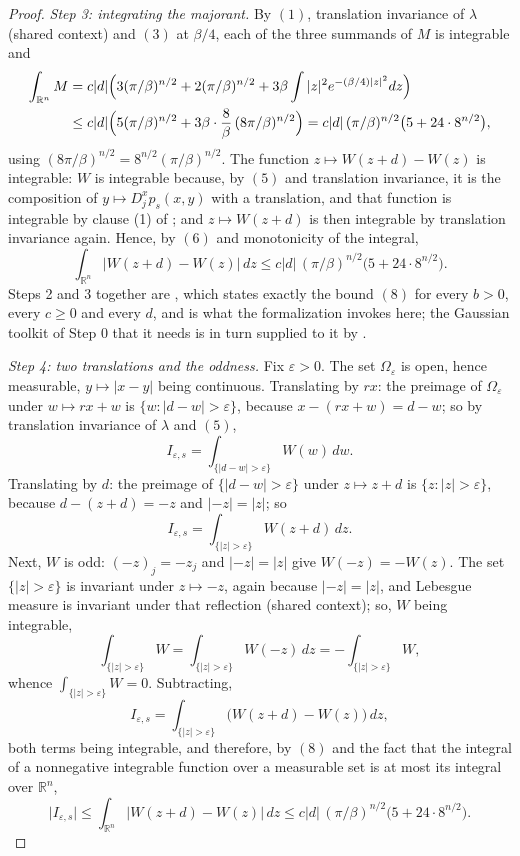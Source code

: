 \begin{proof}
\emph{Step 3: integrating the majorant.}
By $(1)$, translation invariance of $\lambda$ (shared context) and $(3)$ at
$\beta/4$, each of the three summands of $M$ is integrable and
\begin{align*}
  \int_{\mathbb{R}^n} M
    &= c|d|\Bigl(3(\pi/\beta)^{n/2} + 2(\pi/\beta)^{n/2}
        + 3\beta\int|z|^2e^{-(\beta/4)|z|^2}dz\Bigr)\\
    &\leq c|d|\Bigl(5(\pi/\beta)^{n/2}
        + 3\beta\cdot\frac8\beta\,(8\pi/\beta)^{n/2}\Bigr)
     = c|d|\,(\pi/\beta)^{n/2}\bigl(5+24\cdot8^{n/2}\bigr) ,
\end{align*}
using $(8\pi/\beta)^{n/2} = 8^{n/2}(\pi/\beta)^{n/2}$.  The function
$z \mapsto W(z+d)-W(z)$ is integrable: $W$ is integrable because, by $(5)$ and
translation invariance, it is the composition of
$y \mapsto D_j^xp_s(x,y)$ with a translation, and that function is integrable by
clause (1) of ; and $z \mapsto W(z+d)$ is
then integrable by translation invariance again.  Hence, by $(6)$ and
monotonicity of the integral,
\begin{equation*}
  \int_{\mathbb{R}^n}\bigl|W(z+d)-W(z)\bigr|\,dz
    \leq c|d|\,(\pi/\beta)^{n/2}\bigl(5+24\cdot8^{n/2}\bigr) . \tag{8}
\end{equation*}
Steps 2 and 3 together are , which states
exactly the bound $(8)$ for every $b > 0$, every $c \geq 0$ and every $d$, and is what
the formalization invokes here; the Gaussian toolkit of Step 0 that it needs is in turn
supplied to it by .

\emph{Step 4: two translations and the oddness.}
Fix $\varepsilon > 0$.  The set $\Omega_\varepsilon$ is open, hence measurable,
$y \mapsto |x-y|$ being continuous.  Translating by $rx$: the preimage of
$\Omega_\varepsilon$ under $w \mapsto rx+w$ is
$\{w : |d-w| > \varepsilon\}$, because $x-(rx+w) = d-w$; so by translation
invariance of $\lambda$ and $(5)$,
\[
  I_{\varepsilon,s} = \int_{\{|d-w|>\varepsilon\}} W(w)\,dw .
\]
Translating by $d$: the preimage of $\{|d-w|>\varepsilon\}$ under
$z \mapsto z+d$ is $\{z : |z| > \varepsilon\}$, because $d-(z+d) = -z$ and
$|-z| = |z|$; so
\[
  I_{\varepsilon,s} = \int_{\{|z|>\varepsilon\}} W(z+d)\,dz .
\]
Next, $W$ is odd: $(-z)_j = -z_j$ and $|-z| = |z|$ give $W(-z) = -W(z)$.  The
set $\{|z|>\varepsilon\}$ is invariant under $z \mapsto -z$, again because
$|-z| = |z|$, and Lebesgue measure is invariant under that reflection (shared
context); so, $W$ being integrable,
\[
  \int_{\{|z|>\varepsilon\}} W
    = \int_{\{|z|>\varepsilon\}} W(-z)\,dz
    = -\int_{\{|z|>\varepsilon\}} W ,
\]
whence $\int_{\{|z|>\varepsilon\}}W = 0$.  Subtracting,
\[
  I_{\varepsilon,s}
    = \int_{\{|z|>\varepsilon\}}\bigl(W(z+d)-W(z)\bigr)\,dz ,
\]
both terms being integrable, and therefore, by $(8)$ and the fact that the
integral of a nonnegative integrable function over a measurable set is at most
its integral over $\mathbb{R}^n$,
\begin{equation*}
  \bigl|I_{\varepsilon,s}\bigr|
    \leq \int_{\mathbb{R}^n}\bigl|W(z+d)-W(z)\bigr|\,dz
    \leq c|d|\,(\pi/\beta)^{n/2}\bigl(5+24\cdot8^{n/2}\bigr) . \tag{9}
\end{equation*}


\end{proof}
